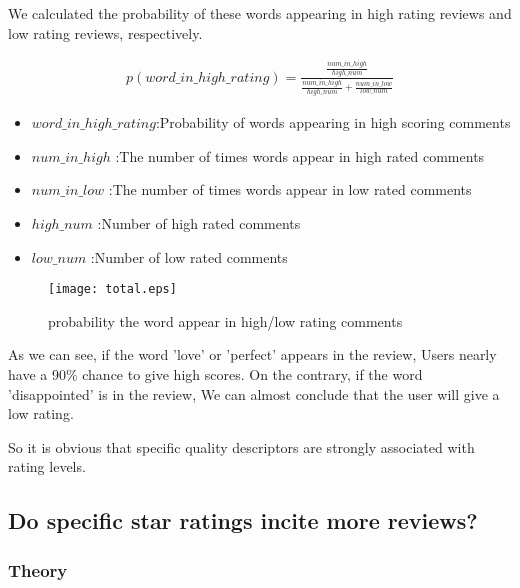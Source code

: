 \documentclass{mcmthesis}
\begin{document}
	We calculated the probability of these words appearing in high rating reviews and low rating reviews, respectively.
	
	\begin{align}
	p(word\_in\_high\_rating)=\frac{\frac{num\_in\_high}{high\_num}}
	{\frac{num\_in\_high}{high\_num}+\frac{num\_in\_low}{low\_num}}
	\end{align}
	\begin{flushleft}
		\begin{itemize}
			\item  $word\_in\_high\_rating$:Probability of words appearing in high scoring comments 
			\item	$num\_in\_high$ :The number of times words appear in high rated comments
			\item $num\_in\_low$ :The number of times words appear in low rated comments
			\item $high\_num$ :Number of high rated comments
			\item $low\_num$ :Number of low rated comments
		\end{itemize}
	\end{flushleft}
	
	\begin{figure}[H]
		\begin{minipage}[t]{1\textwidth}
			\centering
			\texttt{[image: total.eps]}
			\caption{probability the word appear in high/low rating comments\label{fig:1}}
		\end{minipage}
	\end{figure}
	\begin{flushleft}
		As we can see, if the word 'love' or 'perfect' appears in the review, Users nearly have a 90\% chance to give high scores. On the contrary, if the word 'disappointed' is in the review, We can almost conclude that the user will give a low rating.
	\end{flushleft}
	So it is obvious that specific quality descriptors are strongly associated with rating levels.
	
	\subsection{Do specific star ratings incite more reviews? }
	\subsubsection{Theory}
	
\end{document}
